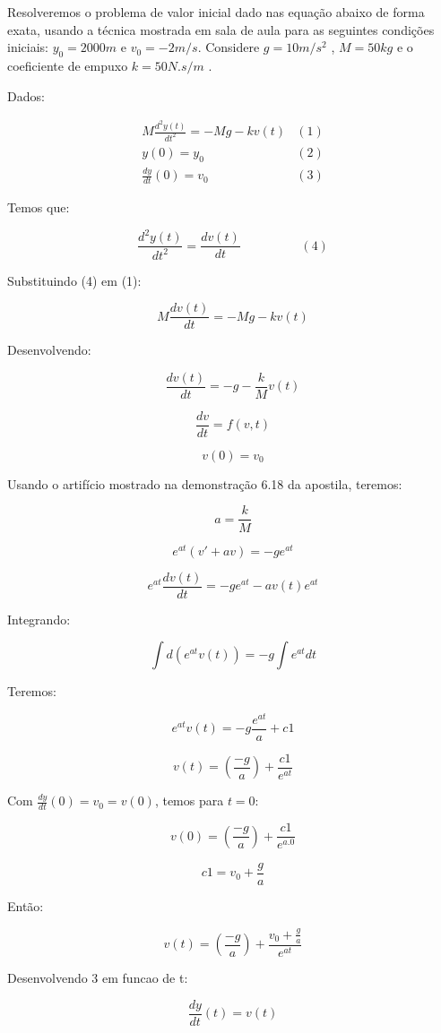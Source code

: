 \begin{example}
 Resolveremos o problema de valor inicial dado nas equação abaixo de forma exata, usando a técnica mostrada em sala de aula para as seguintes condições iniciais: $y_{0}=2000m$ e $v_{0}=-2m/s$. Considere $g=10m/s^{2}$ , $M = 50 kg$ e o coeficiente de empuxo $k = 50 N.s/m$ .

Dados:

\begin{eqnarray}
M\frac{d^{2}y(t)}{dt^{2}}=-Mg-kv(t) & (1)\\
y(0)=y_{0} & (2)\\
\frac{dy}{dt}(0)=v_{0} & (3)
\end{eqnarray}

Temos que:

$$\frac{d^{2}y(t)}{dt^{2}}=\frac{dv(t)}{dt}\hspace{2cm}(4)$$

Substituindo (4) em (1):

$$M\frac{dv(t)}{dt}=-Mg-kv(t)$$

Desenvolvendo:

$$\frac{dv(t)}{dt}=-g-\frac{k}{M}v(t)$$

$$\frac{dv}{dt}=f(v,t)$$

$$v(0)=v_{0}$$

Usando o artifício mostrado na demonstração 6.18 da apostila, teremos:

$$a=\frac{k}{M}$$

$$e^{at}(v'+av)=-ge^{at}$$

$$e^{at}\frac{dv(t)}{dt}=-ge^{at}-av(t)e^{at}$$

Integrando:

$$\int d(e^{at}v(t))=-g\int e^{at}dt$$

Teremos:

$$e^{at}v(t)=-g\frac{e^{at}}{a}+c1$$

$$v(t)=(\frac{-g}{a})+\frac{c1}{e^{at}}$$

Com $\frac{dy}{dt}(0)=v_{0}=v(0)$, temos para $t=0$:

$$v(0)=(\frac{-g}{a})+\frac{c1}{e^{a.0}}$$

$$c1=v_{0}+\frac{g}{a}$$

Então:

$$v(t)=(\frac{-g}{a})+\frac{v_{0}+\frac{g}{a}}{e^{at}}$$

Desenvolvendo 3 em funcao de t:

$$\frac{dy}{dt}(t)=v(t)$$


\end{example}
